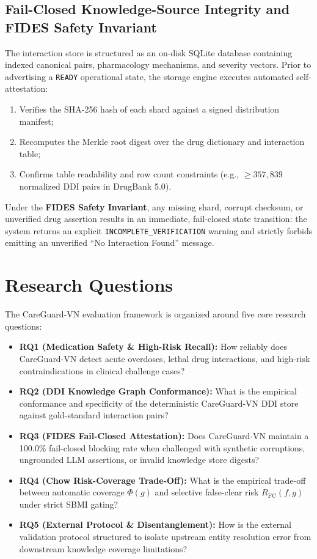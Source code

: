 \documentclass[11pt]{article}
\begin{document}
\subsection{Fail-Closed Knowledge-Source Integrity and FIDES Safety Invariant}
The interaction store is structured as an on-disk SQLite database containing indexed canonical pairs, pharmacology mechanisms, and severity vectors. Prior to advertising a \texttt{READY} operational state, the storage engine executes automated self-attestation:
\begin{enumerate}[leftmargin=*]
  \item Verifies the SHA-256 hash of each shard against a signed distribution manifest;
  \item Recomputes the Merkle root digest over the drug dictionary and interaction table;
  \item Confirms table readability and row count constraints (e.g., $\ge 357,839$ normalized DDI pairs in DrugBank 5.0).
\end{enumerate}
Under the \textbf{FIDES Safety Invariant}, any missing shard, corrupt checksum, or unverified drug assertion results in an immediate, fail-closed state transition: the system returns an explicit \texttt{INCOMPLETE\_VERIFICATION} warning and strictly forbids emitting an unverified ``No Interaction Found'' message.

\section{Research Questions}
The CareGuard-VN evaluation framework is organized around five core research questions:
\begin{itemize}[leftmargin=*]
  \item \textbf{RQ1 (Medication Safety \& High-Risk Recall):} How reliably does CareGuard-VN detect acute overdoses, lethal drug interactions, and high-risk contraindications in clinical challenge cases?
  \item \textbf{RQ2 (DDI Knowledge Graph Conformance):} What is the empirical conformance and specificity of the deterministic CareGuard-VN DDI store against gold-standard interaction pairs?
  \item \textbf{RQ3 (FIDES Fail-Closed Attestation):} Does CareGuard-VN maintain a 100.0\% fail-closed blocking rate when challenged with synthetic corruptions, ungrounded LLM assertions, or invalid knowledge store digests?
  \item \textbf{RQ4 (Chow Risk-Coverage Trade-Off):} What is the empirical trade-off between automatic coverage $\Phi(g)$ and selective false-clear risk $R_{\text{FC}}(f, g)$ under strict SBMI gating?
  \item \textbf{RQ5 (External Protocol \& Disentanglement):} How is the external validation protocol structured to isolate upstream entity resolution error from downstream knowledge coverage limitations?
\end{itemize}
\end{document}
